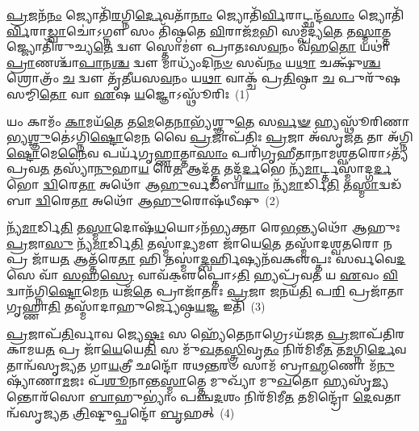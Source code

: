\setcounter{anuvakam}{0}
\-\ul{𑌪𑍍𑌰}\-𑌜𑌨᳴\-\ul{𑌨𑌂} 𑌜𑍍𑌯𑍋𑌤𑌿᳴\-\ul{𑌰}\-𑌗𑍍𑌨𑌿\-\ul{𑌰𑍍𑌦𑍇}\-𑌵𑌤𑌾᳴\-\ul{𑌨𑌾𑌂} 𑌜𑍍𑌯𑍋𑌤𑌿᳴\-\ul{𑌰𑍍𑌵𑌿}\-𑌰𑌾𑌟𑍍𑌛𑌨𑍍𑌦᳴\-\ul{𑌸𑌾𑌂} 𑌜𑍍𑌯𑍋𑌤𑌿᳴\-\ul{𑌰𑍍𑌵𑌿}\-𑌰𑌾\-\ul{𑌡𑍍𑌵𑌾}\-𑌚𑍋॑\-𑌽𑌗𑍍𑌨𑍗 𑌸𑌂 𑌤𑌿᳴𑌷𑍍𑌠𑌤𑍇 \ul{𑌵𑌿}\-𑌰𑌾𑌜᳴\-\ul{𑌮}\-𑌭𑌿 𑌸𑌮𑍍𑌪᳴𑌦𑍍𑌯\-\ul{𑌤𑍇} 𑌤\-\ul{𑌸𑍍𑌮𑌾}\-\-𑌤𑍍𑌤𑌜𑍍𑌜𑍍𑌯𑍋𑌤𑌿᳴𑌰𑍁𑌚𑍍𑌯\-\ul{𑌤𑍇} 𑌦𑍍𑌵𑍗 𑌸𑍍𑌤𑍋𑌮𑍗॑ 𑌪𑍍𑌰𑌾𑌤𑌃𑌸\-\ul{𑌵}\-𑌨𑌂 𑌵᳴𑌹\-\ul{𑌤𑍋} 𑌯𑌥𑌾॑ \ul{𑌪𑍍𑌰𑌾}\-𑌣𑌶𑍍𑌚𑌾᳴\-\ul{𑌪𑌾}\-𑌨\-\ul{𑌶𑍍𑌚} 𑌦𑍍𑌵𑍗 𑌮𑌾𑌧𑍍𑌯𑌂᳴𑌦𑌿\-\ul{𑌨}\-\-\ul{𑍞} 𑌸𑌵᳴\-\ul{𑌨𑌂} 𑌯\-\ul{𑌥𑌾} 𑌚𑌕𑍍𑌷𑍁᳴\-\ul{𑌶𑍍𑌚} 𑌶𑍍𑌰𑍋𑌤𑍍𑌰𑌂᳴ \ul{𑌚} 𑌦𑍍𑌵𑍗 𑌤𑍃᳴𑌤𑍀𑌯𑌸\-\ul{𑌵}\-𑌨𑌂 𑌯\-\ul{𑌥𑌾} 𑌵𑌾𑌕𑍍𑌚᳴ 𑌪𑍍𑌰\-\ul{𑌤𑌿}\-𑌷𑍍𑌠𑌾 \ul{𑌚} 𑌪𑍁𑌰𑍁᳴𑌷𑌸𑌮𑍍𑌮𑌿\-\ul{𑌤𑍋} 𑌵𑌾 \ul{𑌏}\-𑌷 \ul{𑌯}\-𑌜𑍍𑌞𑍋\-𑌽𑌸𑍍𑌥𑍂᳴𑌰𑌿𑌃~(1)

𑌯𑌂 𑌕𑌾𑌮𑌂᳴ \ul{𑌕𑌾}\-𑌮𑌯᳴\-\ul{𑌤𑍇} 𑌤\-\ul{𑌮𑍇}\-𑌤𑍇\-\ul{𑌨𑌾}\-𑌭𑍍𑌯᳴𑌶𑍍𑌞𑍁\-\ul{𑌤𑍇} 𑌸\-\ul{𑌰𑍍𑌵}\-\-\ul{𑍟} 𑌹𑍍𑌯𑌸𑍍𑌥𑍂᳴𑌰𑌿𑌣𑌾𑌭𑍍𑌯\-\ul{𑌶𑍍𑌞𑍁}\-𑌤𑍇॑\-𑌽𑌗𑍍𑌨𑌿\-\ul{𑌷𑍍𑌟𑍋}\-𑌮𑍇\-\ul{𑌨} 𑌵𑍈 \ul{𑌪𑍍𑌰}\-𑌜𑌾𑌪᳴𑌤𑌿𑌃 \ul{𑌪𑍍𑌰}\-𑌜𑌾 𑌅᳴𑌸𑍃𑌜\-\ul{𑌤} 𑌤𑌾 𑌅᳴𑌗𑍍𑌨𑌿\-\ul{𑌷𑍍𑌟𑍋}\-𑌮𑍇\-\ul{𑌨𑍈}\-𑌵 𑌪𑌰𑍍𑌯᳴𑌗𑍃\-\ul{𑌹𑍍𑌣𑌾}\-𑌤𑍍𑌤𑌾\-\ul{𑌸𑌾𑌂} 𑌪𑌰𑌿᳴𑌗𑍃𑌹𑍀𑌤𑌾𑌨𑌾𑌮𑌶𑍍𑌵\-\ul{𑌤}\-𑌰𑍋\-𑌽𑌤𑍍𑌯᳴𑌪𑍍𑌰𑌵\-\ul{𑌤} 𑌤𑌸𑍍𑌯𑌾᳴\-\ul{𑌨𑍁}\-𑌹𑌾\-\ul{𑌯} 𑌰𑍇\-\ul{𑌤} 𑌆𑌦᳴\-\ul{𑌤𑍍𑌤} 𑌤𑌦𑍍𑌗᳴\-\ul{𑌰𑍍𑌦}\-𑌭𑍇 𑌨𑍍𑌯᳴\-\ul{𑌮𑌾}\-𑌰𑍍𑌟𑍍𑌤𑌸𑍍𑌮𑌾॑𑌦𑍍𑌗\-\ul{𑌰𑍍𑌦}\-𑌭𑍋 \ul{𑌦𑍍𑌵𑌿}\-𑌰𑍇\-\ul{𑌤𑌾} 𑌅𑌥𑍋᳴ 𑌆\-\ul{𑌹𑍁}\-𑌰𑍍𑌵𑌡᳴𑌬𑌾\-\ul{𑌯𑌾𑌂} 𑌨𑍍𑌯᳴\-\ul{𑌮𑌾}\-𑌰𑍍𑌡𑌿\-\ul{𑌤𑌿} 𑌤\-\ul{𑌸𑍍𑌮𑌾}\-𑌦𑍍𑌵𑌡᳴𑌬𑌾 \ul{𑌦𑍍𑌵𑌿}\-𑌰𑍇\-\ul{𑌤𑌾} 𑌅𑌥𑍋᳴ 𑌆\-\ul{𑌹𑍁}\-𑌰𑍋𑌷᳴𑌧𑍀𑌷𑍁~(2)

𑌨𑍍𑌯᳴\-\ul{𑌮𑌾}\-𑌰𑍍𑌡𑌿\-\ul{𑌤𑌿} 𑌤\-\ul{𑌸𑍍𑌮𑌾}\-𑌦𑍋𑌷᳴\-\ul{𑌧}\-𑌯𑍋\-𑌽𑌨᳴𑌭𑍍𑌯𑌕𑍍𑌤𑌾 𑌰𑍇\-\ul{𑌭}\-𑌨𑍍𑌤𑍍𑌯𑌥𑍋᳴ 𑌆𑌹𑍁𑌃 \ul{𑌪𑍍𑌰}\-𑌜𑌾\-\ul{𑌸𑍁} 𑌨𑍍𑌯᳴\-\ul{𑌮𑌾}\-𑌰𑍍𑌡𑌿\-\ul{𑌤𑌿} 𑌤𑌸𑍍𑌮𑌾॑\-\ul{𑌦𑍍𑌯}\-𑌮𑍗 𑌜𑌾᳴𑌯𑍇\-\ul{𑌤𑍇} 𑌤𑌸𑍍𑌮𑌾᳴𑌦𑌶𑍍𑌵\-\ul{𑌤}\-𑌰𑍋 𑌨 𑌪𑍍𑌰 𑌜𑌾᳴𑌯\-\ul{𑌤} 𑌆𑌤𑍍𑌤᳴𑌰𑍇\-\ul{𑌤𑌾} 𑌹𑌿 𑌤𑌸𑍍𑌮𑌾॑\-\ul{𑌦𑍍𑌬}\-𑌰𑍍\mbox{}𑌹𑌿𑌷𑍍𑌯𑌨᳴𑌵𑌕𑍢𑌪𑍍𑌤𑌃 𑌸𑌰𑍍𑌵𑌵𑍇\-\ul{𑌦}\-𑌸𑍇 𑌵𑌾᳴ \ul{𑌸}\-𑌹\-\ul{𑌸𑍍𑌰𑍇} 𑌵𑌾𑌵᳴𑌕𑍢॒𑌪𑍍𑌤𑍋\-𑌽\-\ul{𑌤𑌿} 𑌹𑍍𑌯𑌪𑍍𑌰᳴𑌵\-\ul{𑌤} 𑌯 \ul{𑌏}\-𑌵𑌂 \ul{𑌵𑌿}\-𑌦𑍍𑌵𑌾𑌨᳴𑌗𑍍𑌨𑌿\-\ul{𑌷𑍍𑌟𑍋}\-𑌮𑍇\-\ul{𑌨} 𑌯𑌜᳴\-\ul{𑌤𑍇} 𑌪𑍍𑌰𑌾𑌜𑌾᳴𑌤𑌾𑌃 \ul{𑌪𑍍𑌰}\-𑌜𑌾 \ul{𑌜}\-𑌨𑌯᳴\-\ul{𑌤𑌿} 𑌪\-\ul{𑌰𑌿} 𑌪𑍍𑌰𑌜𑌾᳴𑌤𑌾 𑌗𑍃𑌹𑍍𑌣𑌾\-\ul{𑌤𑌿} 𑌤𑌸𑍍𑌮𑌾᳴𑌦𑌾𑌹𑍁𑌰𑍍𑌜𑍍𑌯𑍇𑌷𑍍𑌠\-\ul{𑌯}\-𑌜𑍍𑌞 𑌇𑌤𑌿᳴~(3)

\-\ul{𑌪𑍍𑌰}\-𑌜𑌾𑌪᳴\-\ul{𑌤𑌿}\-𑌰𑍍𑌵𑌾𑌵 𑌜𑍍𑌯𑍇\-\ul{𑌷𑍍𑌠𑌃} 𑌸 𑌹𑍍𑌯𑍇᳴𑌤𑍇𑌨𑌾𑌗𑍍𑌰𑍇\-𑌽𑌯᳴𑌜𑌤 \ul{𑌪𑍍𑌰}\-𑌜𑌾𑌪᳴𑌤𑌿𑌰𑌕𑌾𑌮𑌯\-\ul{𑌤} 𑌪𑍍𑌰 𑌜𑌾᳴\-\ul{𑌯𑍇}\-𑌯𑍇\-\ul{𑌤𑌿} 𑌸 𑌮𑍁᳴\-\ul{𑌖}\-𑌤\-\ul{𑌸𑍍𑌤𑍍𑌰𑌿}\-𑌵𑍃\-\ul{𑌤𑌂} 𑌨𑌿𑌰᳴𑌮𑌿𑌮𑍀\-\ul{𑌤} 𑌤\-\ul{𑌮}\-𑌗𑍍𑌨𑌿\-\-\ul{𑌰𑍍𑌦𑍇}\-𑌵𑌤𑌾𑌨𑍍𑌵᳴𑌸𑍃𑌜𑍍𑌯𑌤 𑌗𑌾\-\ul{𑌯}\-𑌤𑍍𑌰𑍀 𑌛𑌨𑍍𑌦𑍋᳴ 𑌰𑌥\-\ul{𑌨𑍍𑌤}\-𑌰𑍞 𑌸𑌾𑌮᳴ 𑌬𑍍𑌰𑌾\-\ul{𑌹𑍍𑌮}\-𑌣𑍋 𑌮᳴\-\ul{𑌨𑍁}\-𑌷𑍍𑌯𑌾᳴𑌣𑌾\-\ul{𑌮}\-𑌜𑌃 𑌪᳴\-\ul{𑌶𑍂}\-𑌨𑌾𑌨𑍍𑌤\-\ul{𑌸𑍍𑌮𑌾}\-𑌤𑍍𑌤𑍇 𑌮𑍁𑌖𑍍𑌯𑌾᳴ 𑌮𑍁\-\ul{𑌖}\-𑌤𑍋 𑌹𑍍𑌯𑌸𑍃᳴\-\ul{𑌜𑍍𑌯}\-𑌨𑍍𑌤𑍋𑌰᳴𑌸𑍋 \ul{𑌬𑌾}\-𑌹𑍁\-𑌭𑍍𑌯𑌾𑌂॑ 𑌪𑌞𑍍𑌚\-\ul{𑌦}\-𑌶𑌂 𑌨𑌿𑌰᳴𑌮𑌿𑌮𑍀\-\ul{𑌤} 𑌤𑌮𑌿𑌨𑍍𑌦𑍍𑌰𑍋᳴ \ul{𑌦𑍇}\-𑌵𑌤𑌾𑌨𑍍𑌵᳴𑌸𑍃𑌜𑍍𑌯𑌤 \ul{𑌤𑍍𑌰𑌿}\-𑌷𑍍𑌟𑍁𑌪𑍍𑌛𑌨𑍍𑌦𑍋᳴ \ul{𑌬𑍃}\-𑌹𑌤𑍍~(4)

